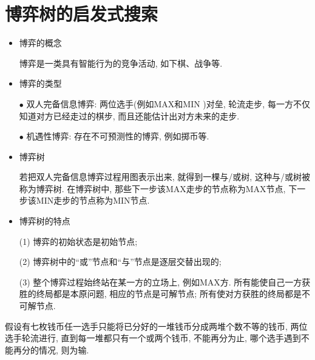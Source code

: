 \section{博弈树的启发式搜索}
\begin{itemize}
\item 博弈的概念

博弈是一类具有智能行为的竞争活动, 如下棋、战争等.
\item 博弈的类型

$\bullet$ 双人完备信息博弈: 两位选手(例如MAX和MIN )对垒, 轮流走步, 每一方不仅知道对方已经走过的棋步, 而且还能估计出对方未来的走步.

$\bullet$ 机遇性博弈: 存在不可预测性的博弈, 例如掷币等.
\item 博弈树

若把双人完备信息博弈过程用图表示出来, 就得到一棵与/或树, 这种与/或树被称为博弈树. 在博弈树中, 那些下一步该MAX走步的节点称为MAX节点, 下一步该MIN走步的节点称为MIN节点.
\item 博弈树的特点

(1) 博弈的初始状态是初始节点;

(2) 博弈树中的“或”节点和“与”节点是逐层交替出现的;

(3) 整个博弈过程始终站在某一方的立场上, 例如MAX方. 所有能使自己一方获胜的终局都是本原问题, 相应的节点是可解节点; 所有使对方获胜的终局都是不可解节点.
\end{itemize}

\begin{example}
假设有七枚钱币任一选手只能将已分好的一堆钱币分成两堆个数不等的钱币, 两位选手轮流进行, 直到每一堆都只有一个或两个钱币, 不能再分为止, 哪个选手遇到不能再分的情况, 则为输.
\end{example}

